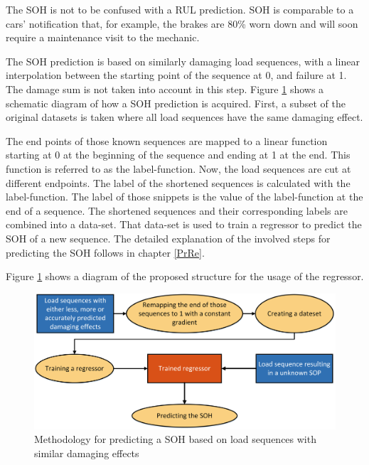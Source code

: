 The SOH is not to be confused with a RUL prediction. SOH is comparable to a cars' notification that, for example, the brakes are 80\% worn down and will soon require a maintenance visit to the mechanic. 

The SOH prediction is based on similarly damaging load sequences, with a linear interpolation between the starting point of the sequence at 0, and failure at 1. The damage sum is not taken into account in this step. 
Figure \ref{fig:GeneralMethod2} shows a schematic diagram of how a SOH prediction is acquired.
First, a subset of the original datasets is taken where all load sequences have the same damaging effect. %

The end points of those known sequences are mapped to a linear function starting at 0 at the beginning of the sequence and ending at 1 at the end. This function is referred to as the label-function. Now, the load sequences are cut at different endpoints. The label of the shortened sequences is calculated with the label-function. The label of those snippets is the value of the label-function at the end of a sequence. The shortened sequences and their corresponding labels are combined into a data-set. That data-set is used to train a regressor to predict the SOH of a new sequence. The detailed explanation of the involved steps for predicting the SOH follows in chapter \ref{PrRe}.

Figure \ref{fig:GeneralMethod2} shows a diagram of the proposed structure for the usage of the regressor. 
 
\begin{figure}[H]
	\centering
	\includegraphics[width=1\linewidth]{IMGs/Method2.png}
	\caption{Methodology for predicting a SOH based on load sequences with similar damaging effects}
	\label{fig:GeneralMethod2}
\end{figure}


